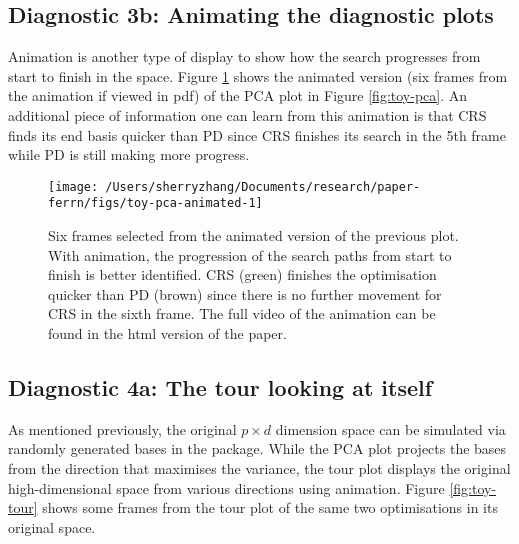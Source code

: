\hypertarget{diagnostic-3b-animating-the-diagnostic-plots}{%
\subsection{Diagnostic 3b: Animating the diagnostic
plots}\label{diagnostic-3b-animating-the-diagnostic-plots}}

Animation is another type of display to show how the search progresses
from start to finish in the space. Figure \ref{fig:toy-pca-animated}
shows the animated version (six frames from the animation if viewed in
pdf) of the PCA plot in Figure \ref{fig:toy-pca}. An additional piece of
information one can learn from this animation is that CRS finds its end
basis quicker than PD since CRS finishes its search in the 5th frame
while PD is still making more progress.

\begin{Schunk}
\begin{figure}

{\centering \texttt{[image: /Users/sherryzhang/Documents/research/paper-ferrn/figs/toy-pca-animated-1]} 

}

\caption[Six frames selected from the animated version of the previous plot]{Six frames selected from the animated version of the previous plot. With animation, the progression of the search paths from start to finish is better identified. CRS (green) finishes the optimisation quicker than PD (brown) since there is no further movement for CRS in the sixth frame. The full video of the animation can be found in the html version of the paper.}\label{fig:toy-pca-animated}
\end{figure}
\end{Schunk}

\hypertarget{diagnostic-4a-the-tour-looking-at-itself}{%
\subsection{Diagnostic 4a: The tour looking at
itself}\label{diagnostic-4a-the-tour-looking-at-itself}}

As mentioned previously, the original \(p \times d\) dimension space can
be simulated via randomly generated bases in the 
\citep{geozoo} package. While the PCA plot projects the bases from the
direction that maximises the variance, the tour plot displays the
original high-dimensional space from various directions using animation.
Figure \ref{fig:toy-tour} shows some frames from the tour plot of the
same two optimisations in its original space.


